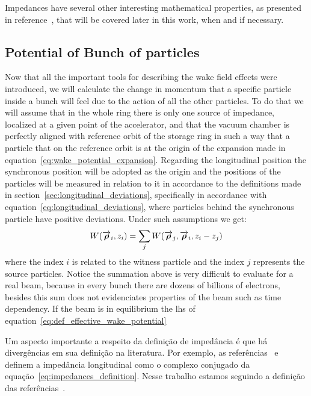 \documentclass[
	12pt,				%
	openright,			%
	oneside,			%
	a4paper,		%
	chapter=TITLE,		%
	section=TITLE,		%
    brazil,				%
	english,			%
	sumario=tradicional,
	]{abntex2}
\begin{document}
  Impedances have several other interesting mathematical properties, as presented in reference~\cite{CHao1993}, that will be covered later in this work, when and if necessary.

  \subsection{Potential of Bunch of particles}

  Now that all the important tools for describing the wake field effects were introduced, we will calculate the change in momentum that a specific particle inside a bunch will feel due to the action of all the other particles. To do that we will assume that in the whole ring there is only one source of impedance, localized at a given point of the accelerator, and that the vacuum chamber is perfectly aligned with reference orbit of the storage ring in such a way that a particle that on the reference orbit is at the origin of the expansion made in equation~\eqref{eq:wake_potential_expansion}. Regarding the longitudinal position the synchronous position will be adopted as the origin and the positions of the particles will be measured in relation to it in accordance to the definitions made in section~\ref{sec:longitudinal_deviations}, specifically in accordance with equation~\ref{eq:longitudinal_deviations}, where particles behind the synchronous particle have positive deviations. Under such assumptions we get:
  \begin{align}\label{eq:def_effective_wake_potential}
  	  W(\overrightarrow{\boldsymbol{\rho}}_i,z_i) = \sum_j W(\overrightarrow{\boldsymbol{\rho}}_j,\overrightarrow{\boldsymbol{\rho}}_i,z_i-z_j)
  \end{align}
  where the index $i$ is related to the witness particle and the index $j$ represents the source particles. Notice the summation above is very difficult to evaluate for a real beam, because in every bunch there are dozens of billions of electrons, besides this sum does not evidenciates properties of the beam such as time dependency. If the beam is in equilibrium the \gls{lhs} of equation~\ref{eq:def_effective_wake_potential}




  Um aspecto importante a respeito da definição de impedância é que há divergências em sua definição na literatura. Por exemplo, as referências~\cite{Zotter1993} e~\cite{Wilson1987} definem a impedância longitudinal como o complexo conjugado da equação~\eqref{eq:impedances_definition}. Nesse trabalho estamos seguindo a definição das referências~\cite{CHao1993,Stupakov2000a,Heifets1991}.
\end{document}
